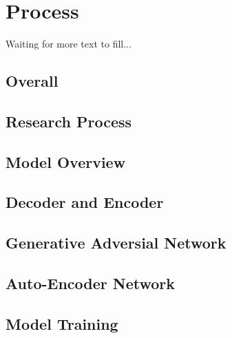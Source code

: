 \section{Process}

Waiting for more text to fill...
\subsection{Overall}
\subsection{Research Process}
\subsection{Model Overview}
\subsection{Decoder and Encoder}
\subsection{Generative Adversial Network}
\subsection{Auto-Encoder Network}
\subsection{Model Training}